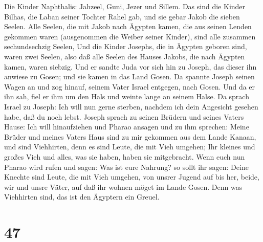  Die Kinder Naphthalis: Jahzeel, Guni, Jezer und Sillem.
 Das sind die Kinder Bilhas, die Laban seiner Tochter Rahel
gab, und sie gebar Jakob die sieben Seelen.  Alle Seelen,
die mit Jakob nach Ägypten kamen, die aus seinen Lenden gekommen waren
(ausgenommen die Weiber seiner Kinder), sind alle zusammen
sechundsechzig Seelen,  Und die Kinder Josephs, die in
Ägypten geboren sind, waren zwei Seelen, also daß alle Seelen des Hauses
Jakobs, die nach Ägypten kamen, waren siebzig.  Und er
sandte Juda vor sich hin zu Joseph, das dieser ihn anwiese zu Gosen; und
sie kamen in das Land Gosen.  Da spannte Joseph seinen
Wagen an und zog hinauf, seinem Vater Israel entgegen, nach Gosen. Und
da er ihn sah, fiel er ihm um den Hals und weinte lange an seinem Halse.
 Da sprach Israel zu Joseph: Ich will nun gerne sterben,
nachdem ich dein Angesicht gesehen habe, daß du noch lebst.
 Joseph sprach zu seinen Brüdern und seines Vaters Hause:
Ich will hinaufziehen und Pharao ansagen und zu ihm sprechen: Meine
Brüder und meines Vaters Haus sind zu mir gekommen aus dem Lande Kanaan,
 und sind Viehhirten, denn es sind Leute, die mit Vieh
umgehen; Ihr kleines und großes Vieh und alles, was sie haben, haben sie
mitgebracht.  Wenn euch nun Pharao wird rufen und sagen:
Was ist eure Nahrung?  so sollt ihr sagen: Deine Knechte
sind Leute, die mit Vieh umgehen, von unsrer Jugend auf bis her, beide,
wir und unsre Väter, auf daß ihr wohnen möget im Lande Gosen. Denn was
Viehhirten sind, das ist den Ägyptern ein Greuel.

\hypertarget{section-46}{%
\section{47}\label{section-46}}

